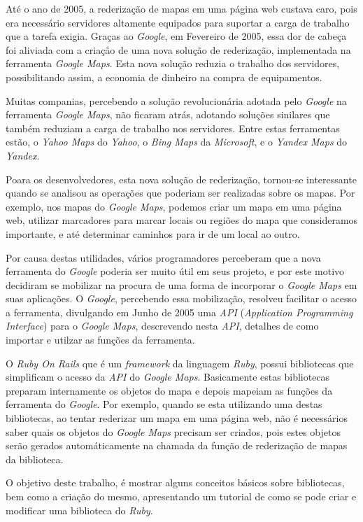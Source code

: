 Até o ano de 2005, a rederização de mapas em uma página web custava caro, pois era necessário
servidores altamente equipados para suportar a carga de trabalho que a tarefa exigia.
Graças ao \emph{Google}, em Fevereiro de 2005, essa dor de cabeça foi aliviada com a criação
de uma nova solução de rederização, implementada na ferramenta \emph{Google Maps}. Esta nova
solução reduzia o trabalho dos servidores, possibilitando assim, a economia de dinheiro na
compra de equipamentos.

Muitas companias, percebendo a solução revolucionária adotada pelo \emph{Google} na
ferramenta \emph{Google Maps}, não ficaram atrás, adotando soluções sinilares que
também reduziam a carga de trabalho nos servidores. Entre estas ferramentas estão, o
\emph{Yahoo Maps} do \emph{Yahoo}, o \emph{Bing Maps} da \emph{Microsoft}, e o
\emph{Yandex Maps} do \emph{Yandex}.

Poara os desenvolvedores, esta nova solução de rederização, tornou-se interessante
quando se analisou as operações que poderiam ser realizadas sobre os mapas. Por exemplo, nos mapas
do \emph{Google Maps}, podemos criar um mapa em uma página web, utilizar marcadores para
marcar locais ou regiões do mapa que consideramos importante, e até determinar caminhos
para ir de um local ao outro.

Por causa destas utilidades, vários programadores perceberam que a nova ferramenta do
\emph{Google} poderia ser muito útil em seus projeto, e por este motivo decidiram se mobilizar
na procura de uma forma de incorporar o \emph{Google Maps} em suas aplicações. O
\emph{Google}, percebendo essa mobilização, resolveu facilitar o acesso a ferramenta, divulgando
em Junho de 2005 uma \emph{API} (\emph{Application Programming Interface}) para o
\emph{Google Maps}, descrevendo nesta \emph{API}, detalhes de como importar e utilzar
as funções da ferramenta.

O \emph{Ruby On Rails} que é um \emph{framework} da linguagem \emph{Ruby}, possui
bibliotecas que simplificam o acesso da \emph{API} do \emph{Google Maps}. Basicamente estas
bibliotecas preparam internamente os objetos do mapa e depois mapeiam as funções da
ferramenta do \emph{Google}. Por exemplo, quando se esta utilizando uma destas bibliotecas,
ao tentar rederizar um mapa em uma página web, não é necessários saber quais os objetos do
\emph{Google Maps} precisam ser criados, pois estes objetos serão gerados automáticamente
na chamada da função de rederização de mapas da biblioteca.

O objetivo deste trabalho, é mostrar alguns conceitos básicos sobre bibliotecas, bem
como a criação do mesmo, apresentando um tutorial de como se pode criar e modificar
uma biblioteca do \emph{Ruby}.

